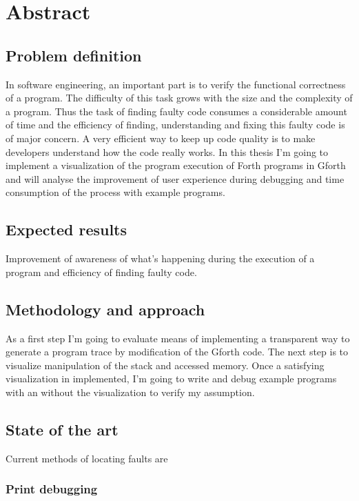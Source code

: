 \chapter*{Abstract}

\section{Problem definition}

In software engineering, an important part is to verify the functional correctness of a program. The difficulty of this task grows with the size and the complexity of a program. Thus the task of finding faulty code consumes a considerable amount of time and the efficiency of finding, understanding and fixing this faulty code is of major concern. A very efficient way to keep up code quality is to make developers understand how the code really works. In this thesis I'm going to implement a visualization of the program execution of Forth programs in Gforth and will analyse the improvement of user experience during debugging and time consumption of the process with example programs.

\section{Expected results}

Improvement of awareness of what's happening during the execution of a program and efficiency of finding faulty code.

\section{Methodology and approach}

As a first step I'm going to evaluate means of implementing a transparent way to generate a program trace by modification of the Gforth code. The next step is to visualize manipulation of the stack and accessed memory. Once a satisfying visualization in implemented, I'm going to write and debug example programs with an without the visualization to verify my assumption.

\section{State of the art}

Current methods of locating faults are

\subsection{Print debugging}

